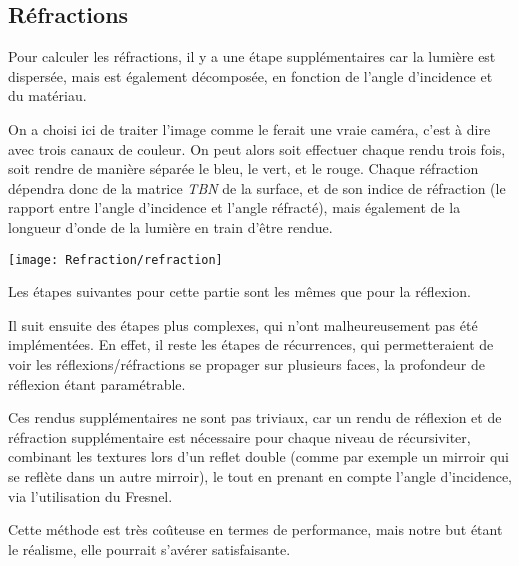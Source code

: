 \subsection{Réfractions}

Pour calculer les réfractions, il y a une étape supplémentaires car la lumière est dispersée,
mais est également décomposée, en fonction de l'angle d'incidence et du matériau.

On a choisi ici de traiter l'image comme le ferait une vraie caméra, c'est à dire
avec trois canaux de couleur.
On peut alors soit effectuer chaque rendu trois fois, soit rendre de manière séparée le bleu,
le vert, et le rouge. Chaque réfraction dépendra donc de la matrice \textit{TBN} de la
surface, et de son indice de réfraction (le rapport entre l'angle d'incidence et l'angle réfracté),
mais également de la longueur d'onde de la lumière en train d'être rendue.

\texttt{[image: Refraction/refraction]}

Les étapes suivantes pour cette partie sont les mêmes que pour la réflexion.

Il suit ensuite des étapes plus complexes, qui n'ont malheureusement pas été implémentées.
En effet, il reste les étapes de récurrences, qui permetteraient de voir les
réflexions/réfractions se propager sur plusieurs faces,
la profondeur de réflexion étant paramétrable.

Ces rendus supplémentaires ne sont pas triviaux, car un rendu de réflexion et de réfraction
supplémentaire est nécessaire pour chaque niveau de récursiviter, combinant les textures lors
d'un reflet double (comme par exemple un mirroir qui se reflète dans un autre mirroir), le tout
en prenant en compte l'angle d'incidence, via l'utilisation du Fresnel.

Cette méthode est très coûteuse en termes de performance,
mais notre but étant le réalisme, elle pourrait s'avérer satisfaisante.

